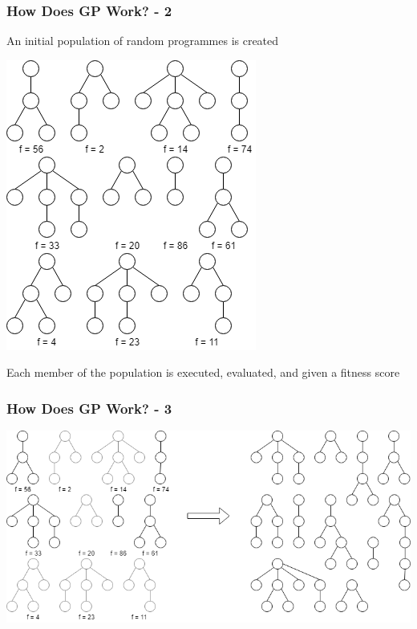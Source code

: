 \documentclass{beamer}
\begin{document}
\begin{frame}
\begin{frame}
\begin{center}
			\end{center}
			
		\end{frame}
	
		\begin{frame}
		
			\frametitle{How Does GP Work? - 2}
			
			\begin{center}
				
				An initial population of random programmes is created
				
				\includegraphics[scale=0.4]{resources/3_gp_example_fitness}
				
				Each member of the population is executed, evaluated, and given a fitness score
				
			\end{center}
			
		\end{frame}
	
		\begin{frame}
		
			\frametitle{How Does GP Work? - 3}
			
			\begin{center}
			
				\includegraphics[scale=0.4]{resources/4_gp_example_selection}
				

\end{center}
\end{frame}
\end{frame}
\end{document}
